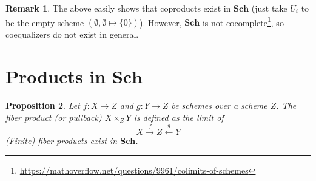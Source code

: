 \documentclass{scrartcl}
\newcommand{\Sch}{\mathrm{\textbf{Sch}}}
\newtheorem{prop}{Proposition}[section]
\theoremstyle{definition}
\newtheorem{remark}[prop]{Remark}
\begin{document}
\begin{remark}
    The above easily shows that coproducts exist in $\Sch$ (just take $U_i$ to be the empty scheme $(\emptyset, \emptyset \mapsto \{0\})$).
    However, $\Sch$ is not cocomplete\footnote{\href{https://mathoverflow.net/questions/9961/colimits-of-schemes}{https://mathoverflow.net/questions/9961/colimits-of-schemes}}, so coequalizers do not exist in general.
\end{remark}

\section{Products in $\Sch$}

\begin{prop}
    Let $f: X \to Z$ and $g: Y \to Z$ be schemes over a scheme $Z$.
    The fiber product (or pullback) $X \times_Z Y$ is defined as the limit of
    \begin{equation*}
        X \overset{f}{\rightarrow} Z \overset{g}{\leftarrow} Y
    \end{equation*}
    (Finite) fiber products exist in $\Sch$.
\end{prop}
\end{document}

